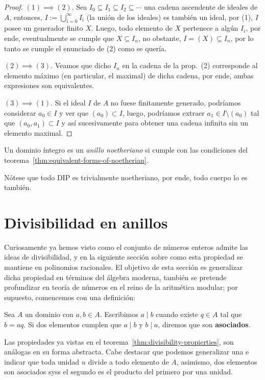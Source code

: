 \documentclass[11pt,oneside]{book}
\begin{document}
\begin{proof}
$(1)\implies(2)$. Sea $I_0\subseteq I_1\subseteq I_2\subseteq\cdots$ una cadena ascendente de ideales de $A$, entonces, $I:=\bigcup_{i=0}^\infty I_i$ (la unión de los ideales) es también un ideal, por (1), $I$ posee un generador finito $X$. Luego, todo elemento de $X$ pertenece a algún $I_i$, por ende, eventualmente se cumple que $X\subseteq I_n$, no obstante, $I=(X)\subseteq I_n$, por lo tanto se cumple el enunciado de (2) como se quería.

$(2)\implies(3)$. Veamos que dicho $I_n$ en la cadena de la prop.~(2) corresponde al elemento máximo (en particular, el maximal) de dicha cadena, por ende, ambas expresiones son equivalentes.

$(3)\implies(1)$. Si el ideal $I$ de $A$ no fuese finitamente generado, podríamos considerar $a_0\in I$ y ver que $(a_0)\subset I$, luego, podríamos extraer $a_1\in I\setminus(a_0)$ tal que $(a_0,a_1)\subset I$ y así sucesivamente para obtener una cadena infinita sin un elemento maximal.
\end{proof}
\begin{mydef}
Un dominio íntegro es un \textit{anillo noetheriano} si cumple con las condiciones del teorema~\ref{thm:equivalent-forms-of-noetherian}.
\end{mydef}
Nótese que todo DIP es trivialmente noetheriano, por ende, todo cuerpo lo es también.

\section{Divisibilidad en anillos}
Curiosamente ya hemos visto como el conjunto de números enteros admite las ideas de divisibilidad, y en la siguiente sección sobre como esta propiedad se mantiene en polinomios racionales. El objetivo de esta sección es generalizar dicha propiedad en términos del álgebra moderna, también se pretende profundizar en teoría de números en el reino de la aritmética modular; por supuesto, comencemos con una definición:
\begin{mydef}[Divisibilidad]
Sea $A$ un dominio con $a,b\in A$. Escribimos $a\mid b$ cuando existe $q\in A$ tal que $b=aq$. Si dos elementos cumplen que $a\mid b$ y $b\mid a$, diremos que son \textbf{asociados}.
\end{mydef}
Las propiedades ya vistas en el teorema~\ref{thm:divisibility-propierties}, son análogas en su forma abstracta. Cabe destacar que podemos generalizar una e indicar que toda unidad $u$ divide a todo elemento de $A$, asimismo, dos elementos son asociados syss el segundo es el producto del primero por una unidad.
\end{document}
